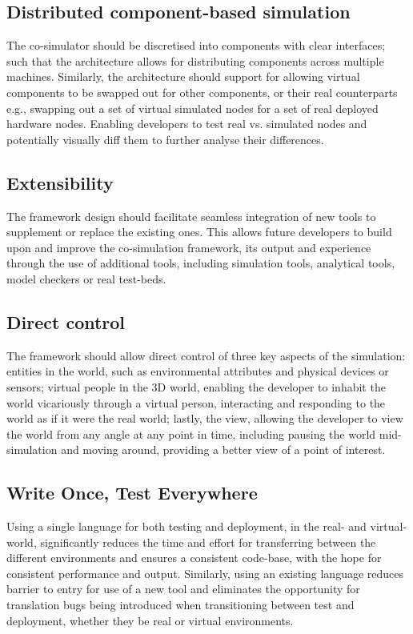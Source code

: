 \subsection{Distributed component-based simulation} %
\label{sub:distributed}
The co-simulator should be discretised into components with clear interfaces; such that the architecture allows for distributing components across multiple machines. Similarly, the architecture should support for allowing virtual components to be swapped out for other components, or their real counterparts e.g., swapping out a set of virtual simulated nodes for a set of real deployed hardware nodes. Enabling developers to test real vs. simulated nodes and potentially visually diff them to further analyse their differences.

\subsection{Extensibility} %
\label{sub:requirements_extensibility}
The framework design should facilitate seamless integration of new tools to supplement or replace the existing ones. This allows future developers to build upon and improve the co-simulation framework, its output and experience through the use of additional tools, including simulation tools, analytical tools, model checkers or real test-beds.

\subsection{Direct control}
\label{sub:requirements_direct_control}
The framework should allow direct control of three key aspects of the simulation: entities in the world, such as environmental attributes and physical devices or sensors; virtual people in the 3D world, enabling the developer to inhabit the world vicariously through a virtual person, interacting and responding to the world as if it were the real world; lastly, the view, allowing the developer to view the world from any angle at any point in time, including pausing the world mid-simulation and moving around, providing a better view of a point of interest.

\subsection{Write Once, Test Everywhere}
\label{sub:requirements_real_code}
Using a single language for both testing and deployment, in the real- and virtual-world, significantly reduces the time and effort for transferring between the different environments and ensures a consistent code-base, with the hope for consistent performance and output. Similarly, using an existing language reduces barrier to entry for use of a new tool and eliminates the opportunity for translation bugs being introduced when transitioning between test and deployment, whether they be real or virtual environments.

